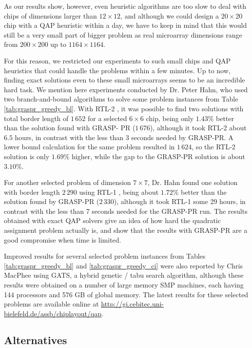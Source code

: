 As our results show, however, even heuristic algorithms are too slow to deal
with chips of dimensions larger than $12 \times 12$, and although we could
design a $20 \times 20$ chip with a QAP heuristic within a day, we have to keep
in mind that this would still be a very small part of bigger problem as real
microarray dimensions range from $200 \times 200$ up to $1164 \times 1164$.

For this reason, we restricted our experiments to such small chips and QAP
heuristics that could handle the problems within a few minutes. Up to now,
finding exact solutions even to these small microarrays seems to be an
incredible hard task. We mention here experiments conducted by Dr. Peter Hahn,
who used two branch-and-bound algorithms to solve some problem instances from
Table \ref{tab:graspr_greedy_bl}. With RTL-2 \citep{Adams}, it was possible to
find two solutions with total border length of $1\,652$ for a selected
$6\times 6$ chip, being only $1.43\%$ better than the solution found with GRASP-
PR ($1\,676$), although it took RTL-2 about $6.5$ hours, in contrast with the
less than 3 seconds needed by GRASP-PR. A lower bound calculation for the same
problem resulted in $1\,624$, so the RTL-2 solution is only $1.69\%$ higher,
while the gap to the GRASP-PR solution is about $3.10\%$.

For another selected problem of dimension $7\times 7$, Dr. Hahn found one
solution with border length $2\,290$ using RTL-1 \citep{Hahn1998}, being about
$1.72\%$ better than the solution found by GRASP-PR ($2\,330$), although it took
RTL-1 some 29 hours, in contrast with the less than 7 seconds needed for the
GRASP-PR run. The results obtained with exact QAP solvers give an idea of how
hard the quadratic assignment problem actually is, and show that the results
with GRASP-PR are a good compromise when time is limited.

Improved results for several selected problem instances from Tables
\ref{tab:graspr_greedy_bl} and \ref{tab:graspr_greedy_ci} were also reported by
Chris MacPhee using GATS, a hybrid genetic / tabu search algorithm, although
these results were obtained on a number of large memory SMP machines, each
having 144 processors and 576 GB of global memory. The latest results for these
selected problems are available online at \url{
http://gi.cebitec.uni-bielefeld.de/assb/chiplayout/qap}.

\subsection{Alternatives}

